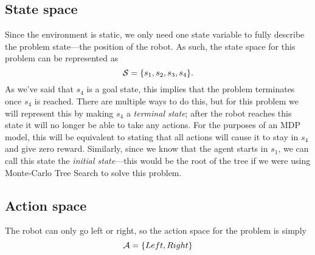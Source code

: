 \documentclass[a4paper]{article}
\begin{document}
\subsection{State space}
Since the environment is static, we only need one state variable to fully
describe the problem state---the position of the robot.
As such, the state space for this problem can be represented as
\begin{equation*}
  \mathcal{S} = \{s_1, s_2, s_3, s_4\} .
\end{equation*}
As we've said that $s_4$ is a goal state, this implies that the
problem terminates once $s_4$ is reached.
There are multiple ways to do this, but for this problem we will represent
this by making $s_4$ a \emph{terminal state};
after the robot reaches this state it will no longer be able to take any
actions.
For the purposes of an MDP model, this will be equivalent to stating that
all actions will cause it to stay in $s_4$ and give zero reward.
Similarly, since we know that the agent starts in $s_1$, we can call
this state the \emph{initial state}---this would be the root of the tree
if we were using Monte-Carlo Tree Search to solve this problem.

\subsection{Action space}
The robot can only go left or right, so the action space for the problem is
simply
\begin{equation*}
  \mathcal{A} = \{ Left, Right \}
\end{equation*}
\end{document}

